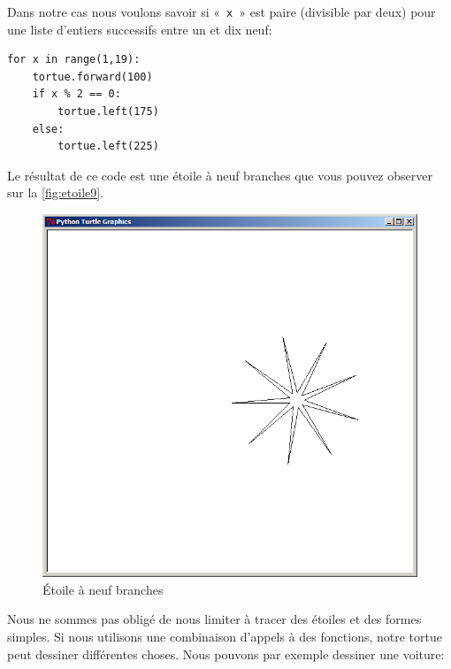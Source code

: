 Dans notre cas nous voulons savoir si « \texttt{x} »  est paire (divisible par deux) pour une liste d'entiers successifs entre un et dix neuf:

\begin{Verbatim}[frame=single,rulecolor=\color{mbleu}, label=à taper]
for x in range(1,19):
    tortue.forward(100)
    if x % 2 == 0:
        tortue.left(175)
    else:
        tortue.left(225)
\end{Verbatim}

Le résultat de ce code est une étoile à neuf branches que vous pouvez observer sur la \autoref{fig:etoile9}.

\begin{figure}[H]
\centering
\includegraphics[scale=0.4]{images/etoile9}
\caption{Étoile à neuf branches}\label{fig:etoile9}
\end{figure}

Nous ne sommes pas obligé de nous limiter à tracer des étoiles et des formes simples. Si nous utilisons une combinaison d'appels à des fonctions, notre tortue peut dessiner différentes choses. Nous pouvons par exemple dessiner une voiture:

